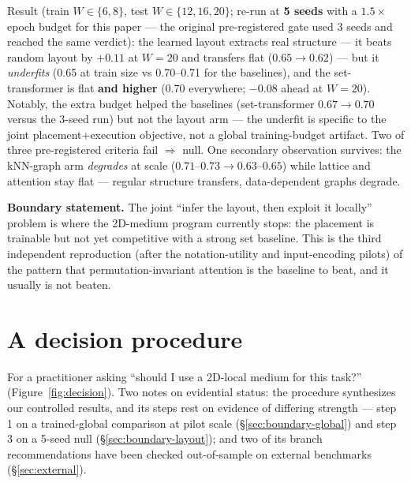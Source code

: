 \documentclass[11pt]{article}
\begin{document}
Result (train $W \in \{6,8\}$, test $W \in \{12,16,20\}$; re-run at
\textbf{5 seeds} with a $1.5\times$ epoch budget for this paper --- the
original pre-registered gate used 3 seeds and reached the same verdict): the
learned layout extracts real structure --- it beats random layout by $+0.11$
at $W = 20$ and transfers flat ($0.65 \to 0.62$) --- but it \emph{underfits}
(0.65 at train size vs 0.70--0.71 for the baselines), and the set-transformer
is flat \textbf{and higher} (0.70 everywhere; $-0.08$ ahead at $W = 20$).
Notably, the extra budget helped the baselines (set-transformer $0.67 \to
0.70$ versus the 3-seed run) but not the layout arm --- the underfit is
specific to the joint placement$+$execution objective, not a global
training-budget artifact. Two of three pre-registered criteria fail
$\Rightarrow$ null. One secondary observation survives: the kNN-graph arm
\emph{degrades} at scale ($0.71$--$0.73 \to 0.63$--$0.65$) while lattice and
attention stay flat --- regular structure transfers, data-dependent graphs
degrade.

\textbf{Boundary statement.} The joint ``infer the layout, then exploit it
locally'' problem is where the 2D-medium program currently stops: the
placement is trainable but not yet competitive with a strong set baseline.
This is the third independent reproduction (after the notation-utility and
input-encoding pilots) of the pattern that permutation-invariant attention is
the baseline to beat, and it usually is not beaten.

\section{A decision procedure}\label{sec:decision}

For a practitioner asking ``should I use a 2D-local medium for this task?''
(Figure~\ref{fig:decision}). Two notes on evidential status: the procedure
synthesizes our controlled results, and its steps rest on evidence of
differing strength --- step 1 on a trained-global comparison at pilot scale
(\S\ref{sec:boundary-global}) and step 3 on a 5-seed null
(\S\ref{sec:boundary-layout}); and two of its branch recommendations have
been checked out-of-sample on external benchmarks (\S\ref{sec:external}).
\end{document}
